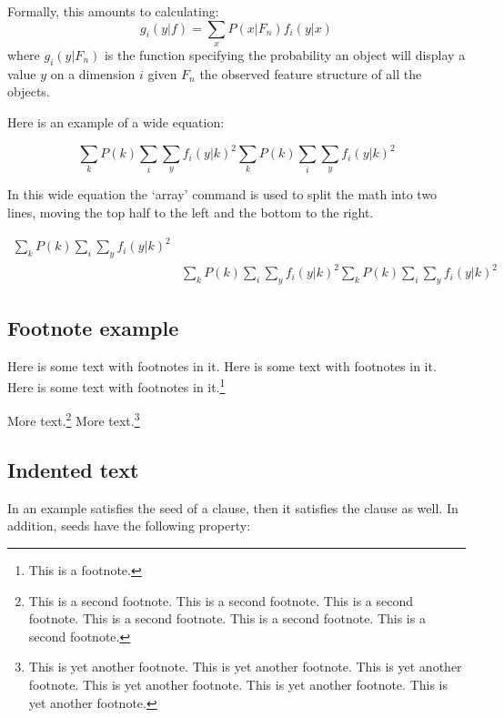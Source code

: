 \begin{article}
Formally, this amounts to calculating:
\begin{equation}
g_i(y|f)=\sum_x P(x|F_n)f_i(y|x)
\end{equation}
where $g_i(y|F_n)$ is the function specifying the probability an object will
display a value $y$ on a dimension $i$ given $F_n$ the observed feature
structure of all the objects.

Here is an example of a wide equation:
\begin{wideequation}
\begin{equation}
\sum_k P(k) \sum_i \sum_y f_i(y|k)^2
\sum_k P(k) \sum_i \sum_y f_i(y|k)^2
\end{equation}
\end{wideequation}

In this wide equation the `array' command is used to split 
the math into two lines, moving the top half to the left
and the bottom to the right.
\begin{wideequation}
\begin{equation}
\begin{array}{lr}
\sum_k P(k) \sum_i \sum_y f_i(y|k)^2\\
&\sum_k P(k) \sum_i \sum_y f_i(y|k)^2
\sum_k P(k) \sum_i \sum_y f_i(y|k)^2
\end{array}
\end{equation}
\end{wideequation}

\subsection{Footnote example}
Here is some text with footnotes in it.
Here is some text with footnotes in it.
Here is some text with footnotes in it.\footnote{This is a footnote.}

More text.\footnote{This is a second footnote.
This is a second footnote.
This is a second footnote.
This is a second footnote.
This is a second footnote.
This is a second footnote.} 
More text.\footnote{This is yet another footnote.
This is yet another footnote.
This is yet another footnote.
This is yet another footnote.
This is yet another footnote.
This is yet another footnote.}

\subsection{Indented text}
In an example satisfies the seed of a clause, then it satisfies the clause
as well. In addition, seeds have the following property:


\end{article}
